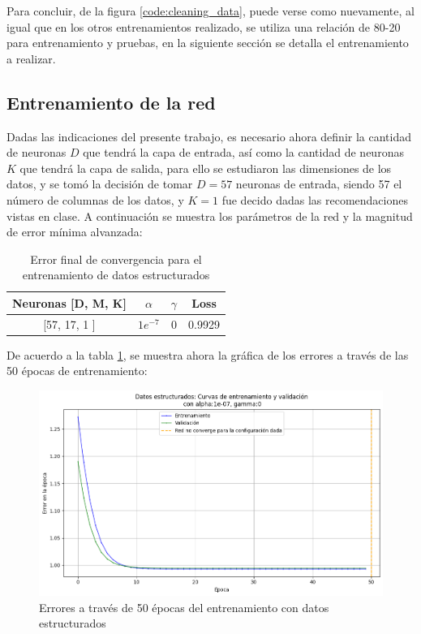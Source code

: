 \documentclass{article}
\begin{document}
Para concluir, de la figura \ref{code:cleaning_data}, puede verse como nuevamente, al igual que en los otros entrenamientos realizado, se utiliza una relación de 80-20 para entrenamiento y pruebas, en la siguiente sección se detalla el entrenamiento a realizar.


\subsection{Entrenamiento de la red}

Dadas las indicaciones del presente trabajo, es necesario ahora definir la cantidad de neuronas $D$ que tendrá la capa de entrada, así como la cantidad de neuronas $K$ que tendrá la capa de salida, para ello se estudiaron las dimensiones de los datos, y se tomó la decisión de tomar $D=57$ neuronas de entrada, siendo 57 el número de columnas de los datos, y $K=1$ fue decido dadas las recomendaciones vistas en clase. A continuación se muestra los parámetros de la red y la magnitud de error mínima alvanzada:


\begin{table}[htbp]
    \centering
    \begin{tabular}{@{}cccc@{}}
    \toprule
    Neuronas {[}D, M, K{]} &  $\alpha$ & $\gamma$ & Loss \\ \midrule
    {[}57, 17, 1 {]} & $1e^{-7}$ & 0 & 0.9929 \\ \bottomrule
    \end{tabular}
    \caption{Error final de convergencia para el entrenamiento de datos estructurados}
    \label{tab:structured_params}
\end{table}

De acuerdo a la tabla \ref{tab:structured_params}, se muestra ahora la gráfica de los errores a través de las 50 épocas de entrenamiento:

\begin{figure}[htbp]
    \centering
    \includegraphics[width=0.65\linewidth]{imgs/structured/structured_data.png}
    \caption{Errores a través de 50 épocas del entrenamiento con datos estructurados}
    \label{fig:test}
\end{figure}
\end{document}
